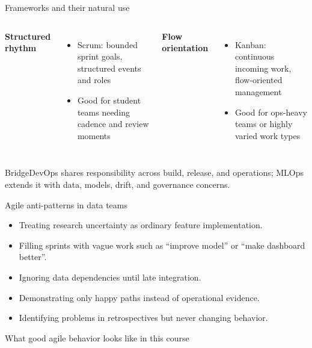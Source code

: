 \begin{frame}{Frameworks and their natural use}
\begin{columns}[T]
\textbf{Structured rhythm}\begin{itemize}\item Scrum: bounded sprint goals, structured events and roles\item Good for student teams needing cadence and review moments\end{itemize}
\textbf{Flow orientation}\begin{itemize}\item Kanban: continuous incoming work, flow-oriented management\item Good for ops-heavy teams or highly varied work types\end{itemize}
\end{columns}
\vspace{0.5em}\begin{block}{Bridge}DevOps shares responsibility across build, release, and operations; MLOps extends it with data, models, drift, and governance concerns.\end{block}
\coursefooter
\end{frame}

\begin{frame}{Agile anti-patterns in data teams}
\begin{itemize}
\item Treating research uncertainty as ordinary feature implementation.
\item Filling sprints with vague work such as ``improve model'' or ``make dashboard better''.
\item Ignoring data dependencies until late integration.
\item Demonstrating only happy paths instead of operational evidence.
\item Identifying problems in retrospectives but never changing behavior.
\end{itemize}
\coursefooter
\end{frame}

\begin{frame}{What good agile behavior looks like in this course}
\coursefooter
\end{frame}

